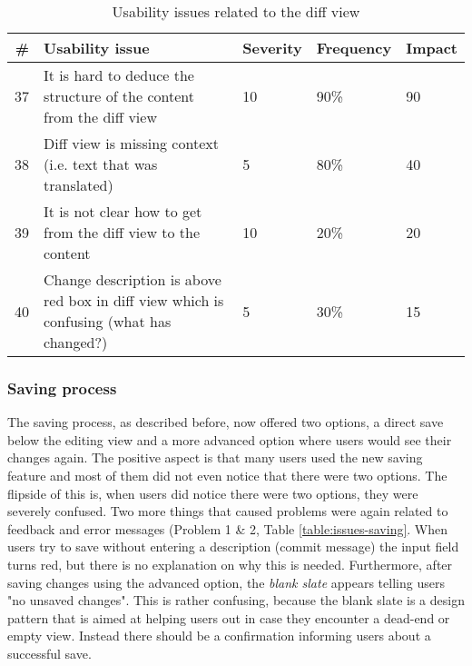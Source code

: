 \begin{table}[h!]
\centering
\begin{tabular}{|r|p{7cm}|l|l|l|}
\hline
\rowcolor[HTML]{EFEFEF}
{\bf \#} & {\bf Usability issue} & {\bf Severity} & {\bf Frequency} & {\bf Impact} \\ \hline
37 & It is hard to deduce the structure of the content from the diff view & 10 & 90\% & 90 \\ \hline
38 & Diff view is missing context (i.e. text that was translated) & 5 & 80\% & 40 \\ \hline
39 & It is not clear how to get from the diff view to the content & 10 & 20\% & 20 \\ \hline
40 & Change description is above red box in diff view which is confusing (what has changed?) & 5 & 30\% & 15 \\ \hline
\end{tabular}
\caption{Usability issues related to the diff view}
\label{table:issues-diff-2nd}
\end{table}


\subsubsection{Saving process}
The saving process, as described before, now offered two options, a direct save below the editing view and a more advanced option where users would see their changes again. The positive aspect is that many users used the new saving feature and most of them did not even notice that there were two options. The flipside of this is, when users did notice there were two options, they were severely confused.
Two more things that caused problems were again related to feedback and error messages (Problem 1 \& 2, Table \ref{table:issues-saving}. When users try to save without entering a description (commit message) the input field turns red, but there is no explanation on why this is needed. Furthermore, after saving changes using the advanced option, the \textit{blank slate} \cite{_blank_????} appears telling users "no unsaved changes". This is rather confusing, because the blank slate is a design pattern that is aimed at helping users out in case they encounter a dead-end or empty view. Instead there should be a confirmation informing users about a successful save.

